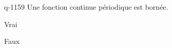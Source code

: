 \begin{truefalse}{q-1159}
Une fonction continue périodique est bornée.
\item* Vrai
\item Faux
\end{truefalse}

